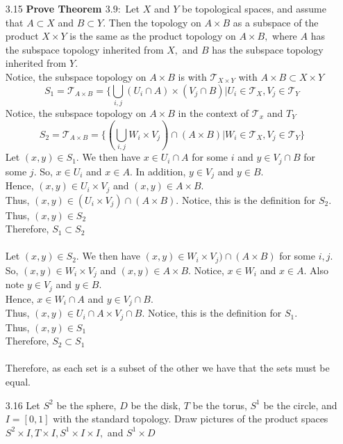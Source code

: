 \documentclass[12pt]{article}
\newcommand{\T}{\mathcal{T}}
\begin{document}
\begin{enumerate}
	\item[3.15] \textbf{Prove Theorem $3.9 :$} Let $X$ and $Y$ be topological spaces, and assume that $A \subset X$ and $B \subset Y .$ Then the topology on $A \times B$ as a subspace of the product $X \times Y$ is the same as the product topology on $A \times B ,$ where $A$ has the subspace topology inherited from $X ,$ and $B$ has the subspace topology inherited from $Y .$\\
	Notice, the subspace topology on $ A\times B $ is with $ \T_{X\times Y} $ with $ A\times B \subset X\times Y$ 
		\[S_1 = \T_{A\times B} = \{\bigcup_{i,j} (U_i\cap A)\times(V_j\cap B)| U_i \in \T_{X}, V_j \in \T_Y \]
	Notice, the subspace topology on $ A\times B $ in the context of $ \T_x $ and $ T_Y $
		\[S_2 = \T_{A\times B}=\{(\bigcup_{i,j}W_i\times V_j)\cap(A\times B)| W_i\in \T_X, V_j \in \T_Y \} \]
	Let $ (x,y)\in S_1 $. We then have $ x\in U_i\cap A $ for some $ i $ and $ y\in V_j \cap B $ for some $ j $. So, $ x\in U_i $ and $ x\in A $. In addition, $ y\in V_j $ and $ y\in B $.\\
	Hence, $ (x,y) \in U_i \times V_j $ and $ (x,y)\in A\times B $.\\
	Thus, $ (x,y)\in (U_i\times V_j)\cap(A\times B) $. Notice, this is the definition for $ S_2 $.\\
	Thus, $ (x,y)\in S_2 $\\
	Therefore, $ S_1\subset S_2 $\\
	\\
	Let $ (x,y)\in S_2$. We then have $ (x,y)\in W_i\times V_j)\cap(A\times B)$ for some $ i,j $. So, $ (x,y)\in W_i \times V_j$ and $ (x,y)\in A\times B $. Notice, $x \in W_i$ and $ x\in A $. Also note $y\in V_j $ and $ y\in B $.\\
	Hence, $ x \in W_i \cap A $ and $ y\in V_j\cap B $.\\
	Thus, $ (x,y) \in U_i \cap A \times V_j\cap B $.  Notice, this is the definition for $ S_1 $.\\
	Thus, $ (x,y)\in S_1 $\\
	Therefore, $ S_2\subset S_1 $\\
	\\
	Therefore, as each set is a subset of the other we have that the sets must be equal.

	\item[3.16] Let $S ^ { 2 }$ be the sphere, $D$ be the disk, $T$ be the torus, $S ^ { 1 }$ be the circle, and $I = [ 0,1 ]$ with the standard topology. Draw pictures of the product spaces
	$S ^ { 2 } \times I , T \times I , S ^ { 1 } \times I \times I ,$ and $S ^ { 1 } \times D$


\end{enumerate}
\end{document}
